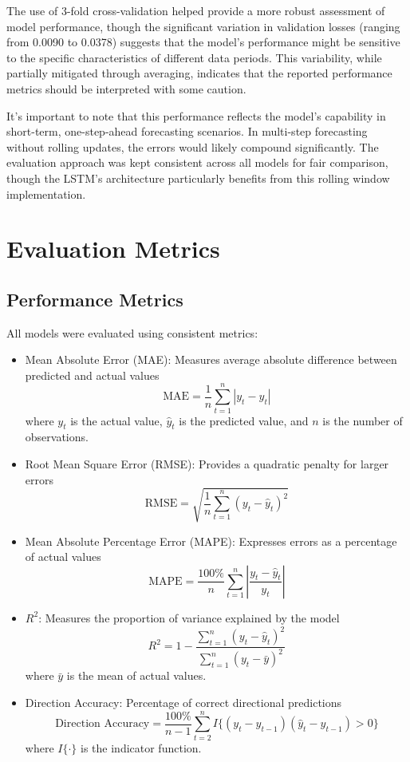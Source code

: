 \documentclass[12pt,a4paper]{report}
\begin{document}
The use of 3-fold cross-validation helped provide a more robust assessment of 
model performance, though the significant variation in validation losses 
(ranging from 0.0090 to 0.0378) suggests that the model's performance might 
be sensitive to the specific characteristics of different data periods. This 
variability, while partially mitigated through averaging, indicates that the 
reported performance metrics should be interpreted with some caution.

It's important to note that this performance reflects the model's capability in 
short-term, one-step-ahead forecasting scenarios. In multi-step forecasting 
without rolling updates, the errors would likely compound significantly. The 
evaluation approach was kept consistent across all models for fair comparison, 
though the LSTM's architecture particularly benefits from this rolling window 
implementation.
\fussy

\section{Evaluation Metrics}
\subsection{Performance Metrics}

All models were evaluated using consistent metrics:

\begin{itemize}
    \item Mean Absolute Error (MAE): Measures average absolute difference between predicted and actual values
    \[
    \text{MAE} = \frac{1}{n} \sum_{t=1}^{n} |y_t - \hat{y}_t|
    \]
    where \(y_t\) is the actual value, \(\hat{y}_t\) is the predicted value, and \(n\) is the number of observations.

    \item Root Mean Square Error (RMSE): Provides a quadratic penalty for larger errors
    \[
    \text{RMSE} = \sqrt{\frac{1}{n} \sum_{t=1}^{n} (y_t - \hat{y}_t)^2}
    \]

    \item Mean Absolute Percentage Error (MAPE): Expresses errors as a percentage of actual values
    \[
    \text{MAPE} = \frac{100\%}{n} \sum_{t=1}^{n} \left|\frac{y_t - \hat{y}_t}{y_t}\right|
    \]

    \item \(R^2\): Measures the proportion of variance explained by the model
    \[
    R^2 = 1 - \frac{\sum_{t=1}^{n}(y_t - \hat{y}_t)^2}{\sum_{t=1}^{n}(y_t - \bar{y})^2}
    \]
    where \(\bar{y}\) is the mean of actual values.

    \item Direction Accuracy: Percentage of correct directional predictions
    \[
    \text{Direction Accuracy} = \frac{100\%}{n-1} \sum_{t=2}^{n} I\{(y_t - y_{t-1})(\hat{y}_t - y_{t-1}) > 0\}
    \]
    where \(I\{\cdot\}\) is the indicator function.
\end{itemize}
\end{document}
